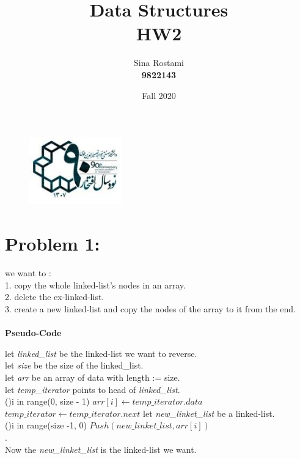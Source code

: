 \documentclass{report}
\title{\Huge Data Structures \\ HW2}
\author{\huge Sina Rostami \\\huge \textbf{9822143}}
\date{Fall 2020}
\begin{document}
    \begin{figure}
        \includegraphics[height = 30mm,width = 40mm]{../kntu_logo.jpg}
    \end{figure}
    \maketitle
    \section*{Problem 1:}
        we want to : \\
        1. copy the whole linked-list's nodes in an array.\\
        2. delete the ex-linked-list.\\
        3. create a new linked-list and copy the nodes of the array to it from the end.\\\\
        \textbf{Pseudo-Code}
        \begin{algorithm}
            let \textit{linked\_list} be the linked-list we want to reverse.\\
            let \textit{size} be the size of the linked\_list.\\
            let \textit{arr} be an array of data with length := size.\\
            let \textit{temp\_iterator} points to head of \textit{linked\_list}.\\
            \For(){i in range(0, size - 1) }{
                $arr[i] \gets  \textit{temp\_iterator}.data$\\
                $\textit{temp\_iterator} \gets \textit{temp\_iterator}.next$
                }
                let \textit{new\_linket\_list} be a linked-list.\\
                \For(){i in range(size -1, 0)}{
                    $Push(new\_linket\_list, arr[i])$\\
                }
                .\\Now the \textit{new\_linket\_list} is the linked-list we want.
        \end{algorithm}
            
        
        
            
    
\end{document}

